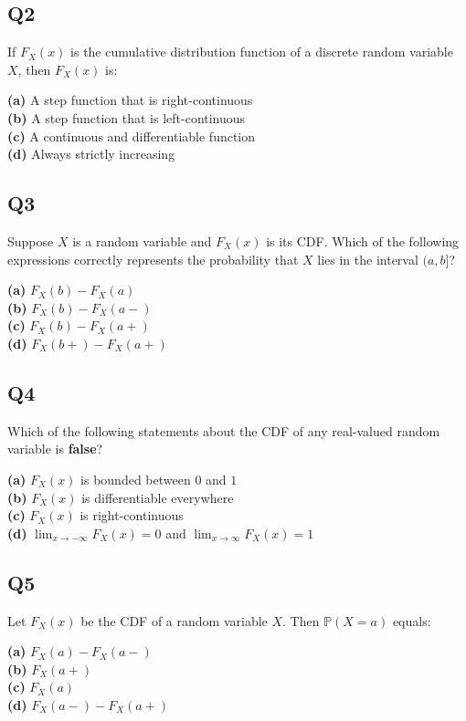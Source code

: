 \subsection*{Q2}
If $F_X(x)$ is the cumulative distribution function of a discrete random variable $X$, then $F_X(x)$ is:

\textbf{(a)} A step function that is right-continuous \\
\textbf{(b)} A step function that is left-continuous \\
\textbf{(c)} A continuous and differentiable function \\
\textbf{(d)} Always strictly increasing

\subsection*{Q3}
Suppose $X$ is a random variable and $F_X(x)$ is its CDF. Which of the following expressions correctly represents the probability that $X$ lies in the interval $(a, b]$?

\textbf{(a)} $F_X(b) - F_X(a)$ \\
\textbf{(b)} $F_X(b) - F_X(a-)$ \\
\textbf{(c)} $F_X(b) - F_X(a+)$ \\
\textbf{(d)} $F_X(b+) - F_X(a+)$

\subsection*{Q4}
Which of the following statements about the CDF of any real-valued random variable is \textbf{false}?

\textbf{(a)} $F_X(x)$ is bounded between $0$ and $1$ \\
\textbf{(b)} $F_X(x)$ is differentiable everywhere \\
\textbf{(c)} $F_X(x)$ is right-continuous \\
\textbf{(d)} $\lim_{x \to -\infty} F_X(x) = 0$ and $\lim_{x \to \infty} F_X(x) = 1$

\subsection*{Q5}
Let $F_X(x)$ be the CDF of a random variable $X$. Then $\mathbb{P}(X = a)$ equals:

\textbf{(a)} $F_X(a) - F_X(a-)$ \\
\textbf{(b)} $F_X(a+)$ \\
\textbf{(c)} $F_X(a)$ \\
\textbf{(d)} $F_X(a-) - F_X(a+)$
